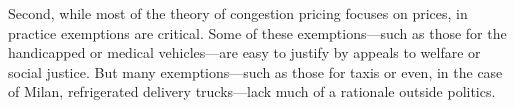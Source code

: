 Second, while most of the theory of congestion pricing focuses on prices, in practice exemptions are critical. Some of these exemptions---such as those for the handicapped or medical vehicles---are easy to justify by appeals to welfare or social justice. But many exemptions---such as those for taxis or even, in the case of Milan, refrigerated delivery trucks---lack much of a rationale outside politics.
